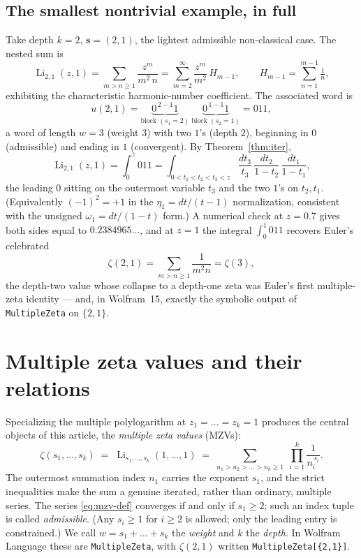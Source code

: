\documentclass[11pt]{article}
\DeclareMathOperator{\Li}{Li}
\theoremstyle{plain}
\theoremstyle{remark}
\begin{document}
\subsection{The smallest nontrivial example, in full}

Take depth $k=2$, $\mathbf s=(2,1)$, the lightest admissible non-classical case. The nested sum is
\[
  \Li_{2,1}(z,1)=\sum_{m>n\ge1}\frac{z^m}{m^2\,n}
  =\sum_{m=2}^{\infty}\frac{z^m}{m^2}\,H_{m-1},\qquad H_{m-1}=\sum_{n=1}^{m-1}\tfrac1n,
\]
exhibiting the characteristic harmonic-number coefficient. The associated word is
\[
  u(2,1)=\underbrace{0^{\,2-1}1}_{\text{block }(s_1=2)}\ \underbrace{0^{\,1-1}1}_{\text{block }(s_2=1)}=011,
\]
a word of length $w=3$ (weight $3$) with two $1$'s (depth $2$), beginning in $0$ (admissible) and ending in $1$ (convergent). By Theorem~\ref{thm:iter},
\[
  \Li_{2,1}(z,1)=\int_0^z 011
  =\int_{0<t_1<t_2<t_3<z}\frac{dt_3}{t_3}\,\frac{dt_2}{1-t_2}\,\frac{dt_1}{1-t_1},
\]
the leading $0$ sitting on the outermost variable $t_3$ and the two $1$'s on $t_2,t_1$. (Equivalently $(-1)^2=+1$ in the $\eta_1=dt/(t-1)$ normalization, consistent with the unsigned $\omega_1=dt/(1-t)$ form.) A numerical check at $z=0.7$ gives both sides equal to $0.2384965\ldots$, and at $z=1$ the integral $\int_0^1 011$ recovers Euler's celebrated
\[
  \zeta(2,1)=\sum_{m>n\ge1}\frac{1}{m^2 n}=\zeta(3),
\]
the depth-two value whose collapse to a depth-one zeta was Euler's first multiple-zeta identity --- and, in Wolfram~15, exactly the symbolic output of \texttt{MultipleZeta} on $\{2,1\}$.


\section{Multiple zeta values and their relations}

Specializing the multiple polylogarithm at $z_1=\dots=z_k=1$ produces the central objects of this article, the \emph{multiple zeta values} (MZVs):
\begin{equation}
  \zeta(s_1,\dots,s_k) \;=\; \Li_{s_1,\dots,s_k}(1,\dots,1)
  \;=\; \sum_{n_1>n_2>\dots>n_k\ge1}\;\prod_{i=1}^{k}\frac{1}{n_i^{\,s_i}}.
  \label{eq:mzv-def}
\end{equation}
The outermost summation index $n_1$ carries the exponent $s_1$, and the strict inequalities make the sum a genuine iterated, rather than ordinary, multiple series. The series \eqref{eq:mzv-def} converges if and only if $s_1\ge2$; such an index tuple is called \emph{admissible}. (Any $s_i\ge1$ for $i\ge2$ is allowed; only the leading entry is constrained.) We call $w=s_1+\dots+s_k$ the \emph{weight} and $k$ the \emph{depth}. In Wolfram Language these are \texttt{MultipleZeta}, with $\zeta(2,1)$ written \texttt{MultipleZeta[\{2,1\}]}.
\end{document}
